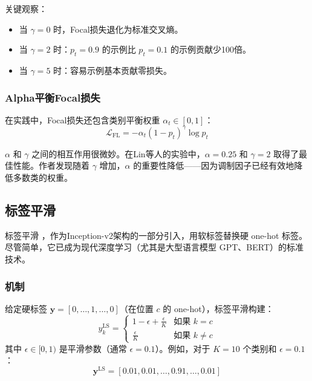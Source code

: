关键观察：
\begin{itemize}
    \item 当 $\gamma = 0$ 时，Focal损失退化为标准交叉熵。
    \item 当 $\gamma = 2$ 时：$p_t = 0.9$ 的示例比 $p_t = 0.1$ 的示例贡献少100倍。
    \item 当 $\gamma = 5$ 时：容易示例基本贡献零损失。
\end{itemize}

\subsubsection{Alpha平衡Focal损失}

在实践中，Focal损失还包含类别平衡权重 $\alpha_t \in [0, 1]$：
\begin{equation}
\mathcal{L}_{\text{FL}} = -\alpha_t (1 - p_t)^\gamma \log p_t
\end{equation}

$\alpha$ 和 $\gamma$ 之间的相互作用很微妙。在Lin等人的实验中，$\alpha = 0.25$ 和 $\gamma = 2$ 取得了最佳性能。作者发现随着 $\gamma$ 增加，$\alpha$ 的重要性降低——因为调制因子已经有效地降低多数类的权重。

\subsection{标签平滑}

标签平滑 \cite{szegedy2016rethinking}，作为Inception-v2架构的一部分引入，用软标签替换硬 one-hot 标签。尽管简单，它已成为现代深度学习（尤其是大型语言模型 GPT、BERT）的标准技术。

\subsubsection{机制}

给定硬标签 $\mathbf{y} = [0, \ldots, 1, \ldots, 0]$（在位置 $c$ 的 one-hot），标签平滑构建：
\begin{equation}
y_k^{\text{LS}} = 
\begin{cases}
1 - \epsilon + \frac{\epsilon}{K} & \text{如果 } k = c \\
\frac{\epsilon}{K} & \text{如果 } k \neq c
\end{cases}
\end{equation}
其中 $\epsilon \in [0, 1)$ 是平滑参数（通常 $\epsilon = 0.1$）。例如，对于 $K = 10$ 个类别和 $\epsilon = 0.1$：
\begin{equation}
\mathbf{y}^{\text{LS}} = [0.01, 0.01, \ldots, 0.91, \ldots, 0.01]
\end{equation}

